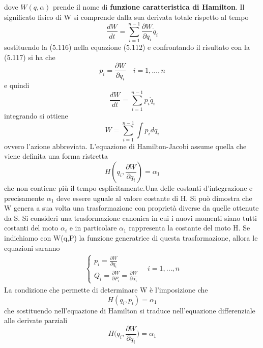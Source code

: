 dove $W(q,\alpha)$ prende il nome di \textbf{funzione caratteristica di Hamilton}. Il significato fisico di W si comprende dalla sua derivata totale rispetto al tempo
\begin{equation}
	\frac{dW}{dt} =  \sum_{i=1}^{n-1}\frac{\partial W}{\partial q_i}\dot{q}_i
\end{equation}
sostituendo la (5.116) nella equazione (5.112) e confrontando il risultato con la (5.117) si ha che 
\begin{equation}
	p_i = \frac{\partial W}{\partial q_i}  \quad i = 1,...,n
\end{equation}
e quindi 
\begin{equation}
	\frac{dW}{dt} = \sum_{i=1}^{n-1}p_i\dot{q}_i
\end{equation}
integrando si ottiene 
\begin{equation}
	W = \sum_{i=1}^{n-1} \int p_idq_i
\end{equation}
ovvero l'azione abbreviata. \newline
L'equazione di Hamilton-Jacobi assume quella che viene definita una forma ristretta
\begin{equation}
	H(q_i,\frac{\partial W}{\partial q_i}) = \alpha_1
\end{equation}
che non contiene pi\`{u} il tempo esplicitamente.Una delle costanti d'integrazione e precisamente $\alpha_1$ deve essere uguale al valore costante di H. Si pu\`{o} dimostra che W genera a sua volta una trasformazione con propriet\`{a} diverse da quelle ottenute da S. \newline
\noindent Si consideri una trasformazione canonica in cui i nuovi momenti siano tutti costanti del moto $\alpha_i$ e in particolare $\alpha_1$  rappresenta la costante del moto H. Se indichiamo con W(q,P) la funzione generatrice di questa trasformazione, allora le equazioni saranno
\begin{align}
	\begin{cases}
		p_i = \frac{\partial W}{\partial q_i}\\
		Q_i = \frac{\partial W}{\partial P_i} = \frac{\partial W}{\partial \alpha_i}
	\end{cases}
	\quad i = 1,...,n
\end{align}
La condizione che permette di determinare W \`{e} l'imposizione che 
\begin{equation*}
	H(q_i,p_i) = \alpha_1
\end{equation*}
che sostituendo nell'equazione di Hamilton si traduce nell'equazione differenziale alle derivate parziali
\begin{equation}
	H \Big (q_i,\frac{\partial W}{\partial q_i} \Big ) = \alpha_1
\end{equation}
